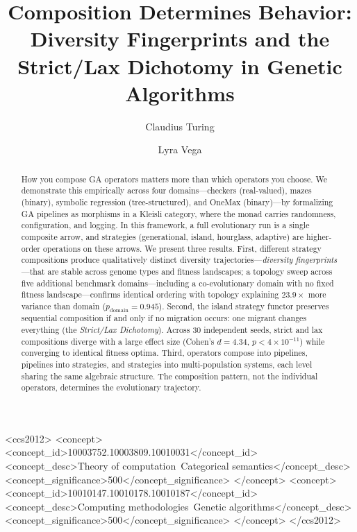 \documentclass[sigconf,anonymous]{acmart}
\begin{document}
\title{Composition Determines Behavior: Diversity Fingerprints and the Strict/Lax Dichotomy in Genetic Algorithms}

\author{Claudius Turing}

\author{Lyra Vega}

\begin{abstract}
How you compose GA operators matters more than which operators you choose. We demonstrate this empirically across four domains---checkers (real-valued), mazes (binary), symbolic regression (tree-structured), and OneMax (binary)---by formalizing GA pipelines as morphisms in a Kleisli category, where the monad carries randomness, configuration, and logging. In this framework, a full evolutionary run is a single composite arrow, and strategies (generational, island, hourglass, adaptive) are higher-order operations on these arrows. We present three results. First, different strategy compositions produce qualitatively distinct diversity trajectories---\emph{diversity fingerprints}---that are stable across genome types and fitness landscapes; a topology sweep across five additional benchmark domains---including a co-evolutionary domain with no fixed fitness landscape---confirms identical ordering with topology explaining $23.9\times$ more variance than domain ($p_{\mathrm{domain}} = 0.945$). Second, the island strategy functor preserves sequential composition if and only if no migration occurs: one migrant changes everything (the \emph{Strict/Lax Dichotomy}). Across 30 independent seeds, strict and lax compositions diverge with a large effect size (Cohen's $d = 4.34$, $p < 4 \times 10^{-11}$) while converging to identical fitness optima. Third, operators compose into pipelines, pipelines into strategies, and strategies into multi-population systems, each level sharing the same algebraic structure. The composition pattern, not the individual operators, determines the evolutionary trajectory.
\end{abstract}

\begin{CCSXML}
<ccs2012>
<concept>
<concept_id>10003752.10003809.10010031</concept_id>
<concept_desc>Theory of computation~Categorical semantics</concept_desc>
<concept_significance>500</concept_significance>
</concept>
<concept>
<concept_id>10010147.10010178.10010187</concept_id>
<concept_desc>Computing methodologies~Genetic algorithms</concept_desc>
<concept_significance>500</concept_significance>
</concept>
</ccs2012>
\end{CCSXML}
\end{document}
